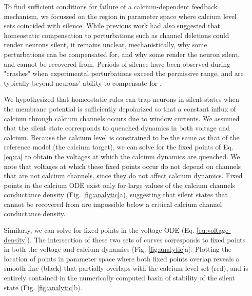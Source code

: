 \documentclass[9pt,lineno]{elife}
\begin{document}
To find sufficient conditions for failure of a calcium-dependent feedback mechanism, we focussed on the region in parameter space where calcium level sets coincided with silence. While previous work had also suggested that homeostatic compensation to perturbations such as channel deletions could render neurons silent, it remains unclear, mechanistically, why some perturbations can be compensated for, and why some render the neuron silent, and cannot be recovered from. Periods of silence have been observed during "crashes" when experimental perturbations exceed the permissive range, and are typically beyond neurons' ability to compensate for  \citep{Haley:2018ky, Haddad:2018bs,Tang:2012ha}. 

We hypothesized that homeostatic rules can trap neurons in silent states when the membrane potential is sufficiently depolarized so that a  constant influx of calcium through calcium channels occurs due to window currents. We assumed that the silent state corresponds to quenched dynamics in both voltage and calcium. Because the calcium level is constrained to be the same as that of the reference model (the calcium target), we can solve for the fixed points of Eq. \ref{eq:ca} to obtain the voltages at which the calcium dynamics are quenched. We note that voltages at which these fixed points occur do not depend on channels that are not calcium channels, since they do not affect calcium dynamics. Fixed points in the calcium ODE exist only for large values of the calcium channels conductance density (Fig. \ref{fig:analytic}a), suggesting that silent states that cannot be recovered from are impossible below a critical calcium channel conductance density. 

Similarly, we can solve for fixed points in the voltage ODE (Eq. \ref{eq:voltage-density}). The intersection of these two sets of curves corresponds to fixed points in both the voltage and calcium dynamics (Fig. \ref{fig:analytic}a). Plotting the location of points in parameter space where both fixed points overlap reveals a smooth line (black) that partially overlaps with the calcium level set (red), and is entirely contained in the numerically computed basin of stability of the silent state (Fig. \ref{fig:analytic}b). 
\end{document}
